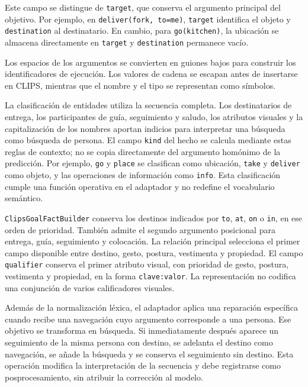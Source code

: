 Este campo se distingue de \texttt{target}, que conserva el
argumento principal del objetivo. Por ejemplo, en
\texttt{deliver(fork, to=me)}, \texttt{target} identifica el objeto
y \texttt{destination} al destinatario. En cambio, para
\texttt{go(kitchen)}, la ubicación se almacena directamente en
\texttt{target} y \texttt{destination} permanece vacío.

Los espacios de los argumentos se convierten en guiones bajos para
construir los identificadores de ejecución. Los valores de cadena se
escapan antes de insertarse en CLIPS, mientras que el nombre y el tipo
se representan como símbolos.

La clasificación de entidades utiliza la secuencia completa. Los
destinatarios de entrega, los participantes de guía, seguimiento y saludo,
los atributos visuales y la capitalización de los nombres aportan indicios
para interpretar una búsqueda como búsqueda de persona. El campo
\texttt{kind} del hecho se calcula mediante estas reglas de contexto;
no se copia directamente del argumento homónimo de la predicción.
Por ejemplo, \texttt{go} y \texttt{place} se clasifican como ubicación,
\texttt{take} y \texttt{deliver} como objeto, y las operaciones de
información como \texttt{info}. Esta clasificación cumple una función
operativa en el adaptador y no redefine el vocabulario semántico.

\texttt{Clips\allowbreak Goal\allowbreak Fact\allowbreak Builder} conserva los destinos indicados por
\texttt{to}, \texttt{at}, \texttt{on} o \texttt{in}, en ese orden
de prioridad. También admite el segundo argumento posicional para
entrega, guía, seguimiento y colocación. La relación principal selecciona
el primer campo disponible entre destino, gesto, postura, vestimenta y
propiedad. El campo \texttt{qualifier} conserva el primer atributo
visual, con prioridad de gesto, postura, vestimenta y propiedad, en la
forma \texttt{clave:valor}. La representación no codifica una conjunción
de varios calificadores visuales.

Además de la normalización léxica, el adaptador aplica una reparación
específica cuando recibe una navegación cuyo argumento corresponde a
una persona. Ese objetivo se transforma en búsqueda. Si inmediatamente
después aparece un seguimiento de la misma persona con destino, se
adelanta el destino como navegación, se añade la búsqueda y se conserva
el seguimiento sin destino. Esta operación modifica la interpretación
de la secuencia y debe registrarse como posprocesamiento, sin atribuir
la corrección al modelo.

